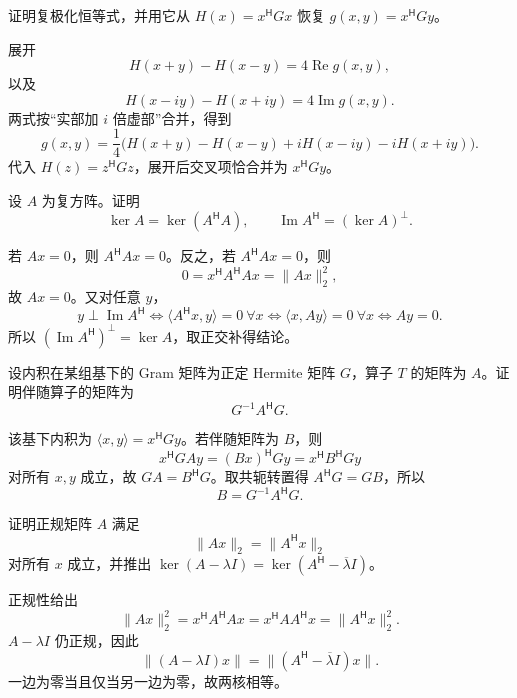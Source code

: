 \begin{exercise}[level=advanced]
证明复极化恒等式，并用它从
$H(x)=x^{\mathsf H}Gx$ 恢复 $g(x,y)=x^{\mathsf H}Gy$。
\begin{solution}
展开
\[
H(x+y)-H(x-y)=4\operatorname{Re}g(x,y),
\]
以及
\[
H(x-iy)-H(x+iy)=4\operatorname{Im}g(x,y).
\]
两式按“实部加 $i$ 倍虚部”合并，得到
\[
g(x,y)=\frac14\bigl(H(x+y)-H(x-y)
+iH(x-iy)-iH(x+iy)\bigr).
\]
代入 $H(z)=z^{\mathsf H}Gz$，展开后交叉项恰合并为 $x^{\mathsf H}Gy$。
\end{solution}
\end{exercise}

\begin{exercise}[level=advanced]
设 $A$ 为复方阵。证明
\[
\ker A=\ker(A^{\mathsf H}A),
\qquad
\operatorname{Im}A^{\mathsf H}=(\ker A)^\perp.
\]
\begin{solution}
若 $Ax=0$，则 $A^{\mathsf H}Ax=0$。反之，若 $A^{\mathsf H}Ax=0$，则
\[
0=x^{\mathsf H}A^{\mathsf H}Ax=\lVert Ax\rVert_2^2,
\]
故 $Ax=0$。又对任意 $y$，
\[
y\perp\operatorname{Im}A^{\mathsf H}
\iff \langle A^{\mathsf H}x,y\rangle=0\ \forall x
\iff \langle x,Ay\rangle=0\ \forall x
\iff Ay=0.
\]
所以 $(\operatorname{Im}A^{\mathsf H})^\perp=\ker A$，取正交补得结论。
\end{solution}
\end{exercise}

\begin{exercise}[level=advanced]
设内积在某组基下的 Gram 矩阵为正定 Hermite 矩阵 $G$，算子 $T$ 的矩阵为 $A$。证明伴随算子的矩阵为
\[
G^{-1}A^{\mathsf H}G.
\]
\begin{solution}
该基下内积为 $\langle x,y\rangle=x^{\mathsf H}Gy$。若伴随矩阵为 $B$，则
\[
x^{\mathsf H}GAy=(Bx)^{\mathsf H}Gy
=x^{\mathsf H}B^{\mathsf H}Gy
\]
对所有 $x,y$ 成立，故 $GA=B^{\mathsf H}G$。取共轭转置得
$A^{\mathsf H}G=GB$，所以
\[
B=G^{-1}A^{\mathsf H}G.
\]
\end{solution}
\end{exercise}

\begin{exercise}[level=advanced]
证明正规矩阵 $A$ 满足
\[
\lVert Ax\rVert_2=\lVert A^{\mathsf H}x\rVert_2
\]
对所有 $x$ 成立，并推出
$\ker(A-\lambda I)=\ker(A^{\mathsf H}-\overline\lambda I)$。
\begin{solution}
正规性给出
\[
\lVert Ax\rVert_2^2=x^{\mathsf H}A^{\mathsf H}Ax
=x^{\mathsf H}AA^{\mathsf H}x
=\lVert A^{\mathsf H}x\rVert_2^2.
\]
$A-\lambda I$ 仍正规，因此
\[
\lVert(A-\lambda I)x\rVert
=\lVert(A^{\mathsf H}-\overline\lambda I)x\rVert.
\]
一边为零当且仅当另一边为零，故两核相等。
\end{solution}
\end{exercise}

